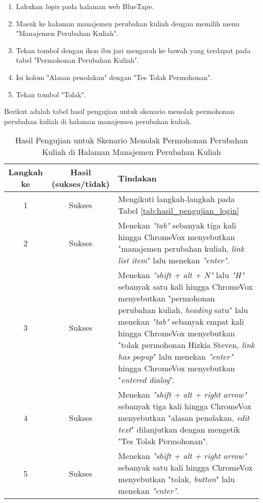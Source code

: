 \begin{enumerate}
    \item Lakukan \textit{login} pada halaman web BlueTape.
    \item Masuk ke halaman manajemen perubahan kuliah dengan memilih menu "Manajemen Perubahan Kuliah".
    \item Tekan tombol dengan ikon ibu jari mengarah ke bawah yang terdapat pada tabel "Permohonan Perubahan Kuliah".
    \item Isi kolom "Alasan penolakan" dengan "Tes Tolak Permohonan".
    \item Tekan tombol "Tolak".
\end{enumerate}

Berikut adalah tabel hasil pengujian untuk skenario menolak permohonan perubahan kuliah di halaman manajemen perubahan kuliah.

\begin{table}[H]
    \centering 
    \caption{Hasil Pengujian untuk Skenario Menolak Permohonan Perubahan Kuliah di Halaman Manajemen Perubahan Kuliah}
    \label{tab:hasil_pengujian_menolak_permohonan_perubahan_kuliah_di_halaman_manajemen_perubahan_kuliah}
    \begin{tabular}{|c|c|p{10cm}|}
        \toprule
        Langkah ke & Hasil (sukses/tidak) & Tindakan \\

        \midrule
        1 & Sukses & Mengikuti langkah-langkah pada Tabel \ref{tab:hasil_pengujian_login} \\
        2 & Sukses & Menekan \textit{"tab"} sebanyak tiga kali hingga ChromeVox menyebutkan "manajemen perubahan kuliah, \textit{link list item}" lalu menekan \textit{"enter"}. \\
        3 & Sukses & Menekan \textit{"shift + alt + N"} lalu \textit{"H"} sebanyak satu kali hingga ChromeVox menyebutkan "permohonan perubahan kuliah, \textit{heading} satu" lalu menekan \textit{"tab"} sebanyak empat kali hingga ChromeVox menyebutkan "tolak permohonan Hizkia Steven, \textit{link has popup}" lalu menekan \textit{"enter"} hingga ChromeVox menyebutkan "\textit{entered dialog}". \\
        4 & Sukses & Menekan \textit{"shift + alt + right arrow"} sebanyak tiga kali hingga ChromeVox menyebutkan "alasan penolakan, \textit{edit text}" dilanjutkan dengan mengetik "Tes Tolak Permohonan". \\
        5 & Sukses & Menekan \textit{"shift + alt + right arrow"} sebanyak satu kali hingga ChromeVox menyebutkan "tolak, \textit{button}" lalu menekan \textit{"enter"}. \\ 

        \bottomrule

    \end{tabular}
\end{table}

